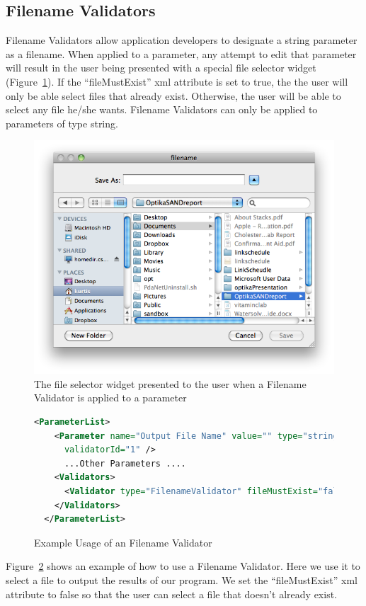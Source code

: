 \subsection{Filename Validators}
Filename Validators allow application developers to designate a string parameter as a filename. When applied to a parameter,
any attempt to edit that parameter will result in the user being presented with a special file selector widget (Figure~\ref{fileSelectorWidget}). If the 
``fileMustExist'' xml attribute is set to true, the the user will only be able select files that already exist. Otherwise, the user will be able
to select any file he/she wants. Filename Validators can only be applied to parameters of type string. \begin{figure}
\centering
\includegraphics[scale=0.5]{graphics/fileWidget}
\caption{The file selector widget presented to the user when a Filename Validator is applied to a parameter}
\label{fileSelectorWidget}
\end{figure}
\begin{figure}
  \centering
  \begin{lstlisting}[language=XML]
  <ParameterList>
    <Parameter name="Output File Name" value="" type="string" docString="Name of the output file."
      validatorId="1" />
      ...Other Parameters ....
    <Validators>
      <Validator type="FilenameValidator" fileMustExist="false" validatorId="1">
    </Validators>
  </ParameterList>
  \end{lstlisting}
  \caption{Example Usage of an Filename Validator}
  \label{filenamevalidatorXML}
\end{figure}
Figure~\ref{filenamevalidatorXML} shows an example of how to use a Filename Validator. Here we use it to select a file to output the results
of our program. We set the ``fileMustExist'' xml attribute to false so that the user can select a file that doesn't already exist.

